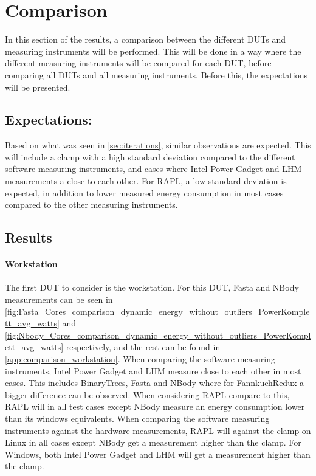 \section{Comparison}\label{sec:comparison}

In this section of the results, a comparison between the different DUTs and measuring instruments will be performed. This will be done in a way where the different measuring instruments will be compared for each DUT, before comparing all DUTs and all measuring instruments. Before this, the expectations will be presented.


\subsection{Expectations:} Based on what was seen in \cref{sec:iterations}, similar observations are expected. This will include a clamp with a high standard deviation compared to the different software measuring instruments, and cases where Intel Power Gadget and LHM measurements a close to each other. For RAPL, a low standard deviation is expected, in addition to lower measured energy consumption in most cases compared to the other measuring instruments.


\subsection{Results}
\paragraph{Workstation}




The first DUT to consider is the workstation. For this DUT, Fasta and NBody measurements can be seen in \cref{fig:Fasta_Cores_comparison_dynamic_energy_without_outliers_PowerKomplett_avg_watts} and \cref{fig:Nbody_Cores_comparison_dynamic_energy_without_outliers_PowerKomplett_avg_watts} respectively, and the rest can be found in \cref{app:comparison_workstation}. When comparing the software measuring instruments, Intel Power Gadget and LHM measure close to each other in most cases. This includes BinaryTrees, Fasta and NBody where for FannkuchRedux a bigger difference can be observed. When considering RAPL compare to this, RAPL will in all test cases except NBody measure an energy consumption lower than its windows equivalents. When comparing the software measuring instruments against the hardware measurements, RAPL will against the clamp on Linux in all cases except NBody get a measurement higher than the clamp. For Windows, both Intel Power Gadget and LHM will get a measurement higher than the clamp.

